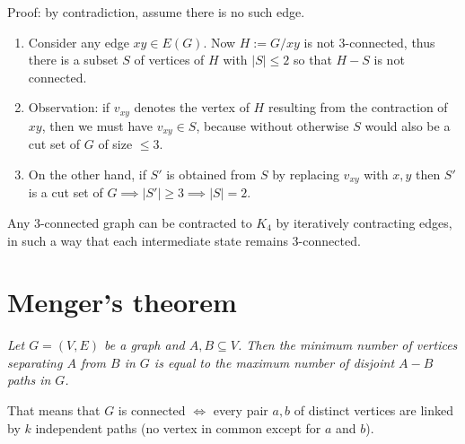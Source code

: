 		Proof: by contradiction, assume there is no such edge.
		\begin{enumerate}
			\item Consider any edge $xy \in E(G)$. Now $H := G / xy$ is not 3-connected, thus there is a subset $S$ of vertices of $H$ with $|S| \leq 2$ so that $H - S$ is not connected. 
			\item Observation: if $v_{xy}$ denotes the vertex of $H$ resulting from the contraction of $xy$, then we must have $v_{xy} \in S$, because without otherwise $S$ would also be a cut set of $G$ of size $\leq 3$.
			\item On the  other hand, if $S'$ is obtained from $S$ by replacing $v_{xy}$ with $x,y$ then $S'$ is a cut set of $G \implies |S'| \geq 3 \implies |S| = 2$.
		\end{enumerate}
		
		Any 3-connected graph can be contracted to $K_4$ by iteratively contracting edges, in such a way that each intermediate state remains 3-connected.
		
		
	\section{Menger's theorem}
		\textit{Let $G = (V,E)$ be a graph and $A, B \subseteq V$. Then the minimum number of vertices separating $A$ from $B$ in $G$ is equal to the maximum number of disjoint $A-B$ paths in $G$.\\}
		
		That means that $G$ is connected $\iff$ every pair $a,b$ of distinct vertices are linked by $k$ independent paths (no vertex in common except for $a$ and $b$). 
		

